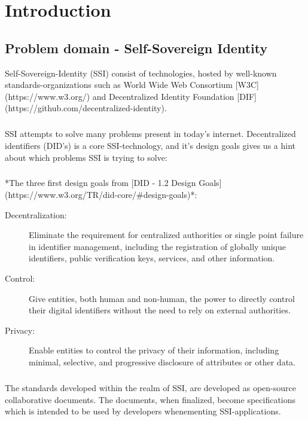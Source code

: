 \chapter{Introduction}

\section{Problem domain - Self-Sovereign Identity}

Self-Sovereign-Identity (SSI) consist of technologies, hosted by well-known standards-organizations such as World Wide Web Consortium [W3C](https://www.w3.org/) and Decentralized Identity Foundation [DIF](https://github.com/decentralized-identity).

\paragraph{}
SSI attempts to solve many problems present in today's internet. Decentralized identifiers (DID's) is a core SSI-technology, and it's design goals gives us a hint about which problems SSI is trying to solve:


\paragraph{}
*The three first design goals from [DID - 1.2 Design Goals](https://www.w3.org/TR/did-core/#design-goals)*:
\begin{description}
    
    \item[Decentralization:] Eliminate the requirement for centralized authorities or single point failure in identifier management, including the registration of globally unique identifiers, public verification keys, services, and other information.
    \item[Control:] Give entities, both human and non-human, the power to directly control their digital identifiers without the need to rely on external authorities.
    \item [Privacy:] Enable entities to control the privacy of their information, including minimal, selective, and progressive disclosure of attributes or other data.

\end{description}

\paragraph{}
The standards developed within the realm of SSI, are developed as open-source collaborative documents. The documents, when finalized, become specifications which is intended to be used by developers whenementing SSI-applications.

